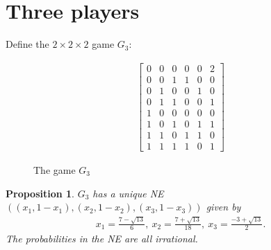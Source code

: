 \documentclass[preprint,12pt,authoryear]{elsarticle}
\newtheorem{proposition}[theorem]{Proposition}
\begin{document}
\section{Three players}\label{sec:3}

Define the $2\times2\times2$ game $G_3$:
\begin{figure}[H]
\centering
\begin{align*}
  \left[\begin{array}{ccc|ccc}
    0&0&0&0&0&2\\
    0&0&1&1&0&0\\
    0&1&0&0&1&0\\
    0&1&1&0&0&1\\
    1&0&0&0&0&0\\
    1&0&1&0&1&1\\
    1&1&0&1&1&0\\
    1&1&1&1&0&1
  \end{array}\right]
\end{align*}
\caption{The game $G_3$}
\label{fig:G3}
\end{figure}

\begin{proposition}\label{prop:n=3}
  $G_3$ has a unique NE $((x_1,1-x_1),(x_2,1-x_2),(x_3,1-x_3))$ given by
  \begin{align*}
    x_1=\frac{7-\sqrt{13}}{6},~x_2=\frac{7+\sqrt{13}}{18},~x_3=\frac{-3+\sqrt{13}}{2}.
  \end{align*}
  The probabilities in the NE are all irrational.
\end{proposition}
\end{document}
